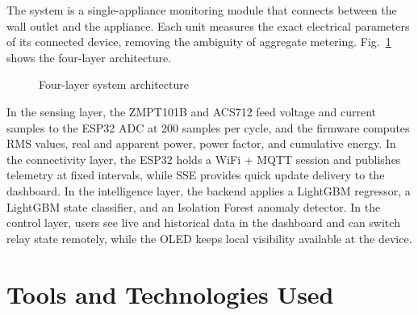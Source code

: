 \documentclass[12pt, a4paper]{article}
\numberwithin{figure}{section}
\numberwithin{table}{section}
\begin{document}
	The system is a single-appliance monitoring module that connects between the wall outlet and the appliance. Each unit measures the exact electrical parameters of its connected device, removing the ambiguity of aggregate metering. Fig.~\ref{fig:layers} shows the four-layer architecture.
	
	\begin{figure}[H]
		\centering
		\caption{Four-layer system architecture}
		\label{fig:layers}
	\end{figure}

	In the sensing layer, the ZMPT101B and ACS712 feed voltage and current samples to the ESP32 ADC at 200 samples per cycle, and the firmware computes RMS values, real and apparent power, power factor, and cumulative energy. In the connectivity layer, the ESP32 holds a WiFi + MQTT session and publishes telemetry at fixed intervals, while SSE provides quick update delivery to the dashboard. In the intelligence layer, the backend applies a LightGBM regressor, a LightGBM state classifier, and an Isolation Forest anomaly detector. In the control layer, users see live and historical data in the dashboard and can switch relay state remotely, while the OLED keeps local visibility available at the device.
	
	\newpage
	
	\section{Tools and Technologies Used}\label{sec:tools}
	
\end{document}
